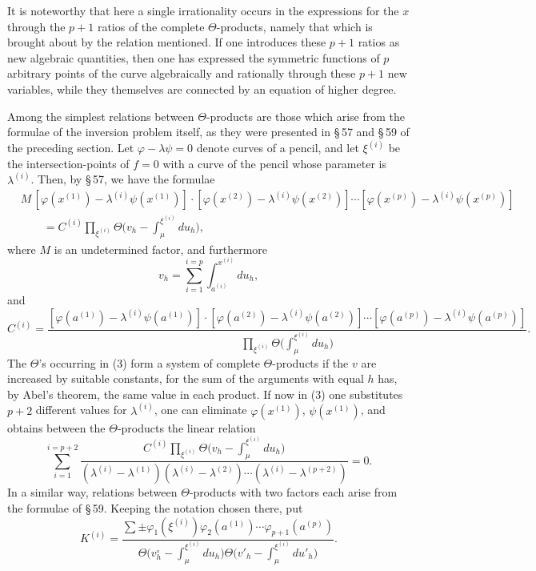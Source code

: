 \documentclass[10pt]{article}
\begin{document}
It is noteworthy that here a single irrationality occurs in the expressions for the \(x\) through the \(p+1\) ratios of the complete \(\Theta\)-products, namely that which is brought about by the relation mentioned. If one introduces these \(p+1\) ratios as new algebraic quantities, then one has expressed the symmetric functions of \(p\) arbitrary points of the curve algebraically and rationally through these \(p+1\) new variables, while they themselves are connected by an equation of higher degree.

Among the simplest relations between \(\Theta\)-products are those which arise from the formulae of the inversion problem itself, as they were presented in \S\,57 and \S\,59 of the preceding section. Let \(\varphi-\lambda\psi=0\) denote curves of a pencil, and let \(\xi^{(i)}\) be the intersection-points of \(f=0\) with a curve of the pencil whose parameter is \(\lambda^{(i)}\). Then, by \S\,57, we have the formulae
\[
\tag{3}
\begin{aligned}
&M\,[\varphi(x^{(1)})-\lambda^{(i)}\psi(x^{(1)})]\cdot[\varphi(x^{(2)})-\lambda^{(i)}\psi(x^{(2)})]\cdots[\varphi(x^{(p)})-\lambda^{(i)}\psi(x^{(p)})]\\
&\qquad = C^{(i)}\prod_{\xi^{(i)}}\Theta\!\biggl(v_h-\int_{\mu}^{\xi^{(i)}}du_h\biggr),
\end{aligned}
\]
where \(M\) is an undetermined factor, and furthermore
\[
v_h=\sum_{i=1}^{i=p}\int_{a^{(i)}}^{x^{(i)}}du_h,
\]
and
\[
C^{(i)}=\frac{[\varphi(a^{(1)})-\lambda^{(i)}\psi(a^{(1)})]\cdot[\varphi(a^{(2)})-\lambda^{(i)}\psi(a^{(2)})]\cdots[\varphi(a^{(p)})-\lambda^{(i)}\psi(a^{(p)})]}{\displaystyle\prod_{\xi^{(i)}}\Theta\!\biggl(\int_{\mu}^{\xi^{(i)}}du_h\biggr)}.
\]
The \(\Theta\)'s occurring in (3) form a system of complete \(\Theta\)-products if the \(v\) are increased by suitable constants, for the sum of the arguments with equal \(h\) has, by Abel's theorem, the same value in each product. If now in (3) one substitutes \(p+2\) different values for \(\lambda^{(i)}\), one can eliminate \(\varphi(x^{(1)})\), \(\psi(x^{(1)})\), and obtains between the \(\Theta\)-products the linear relation
\[
\sum_{i=1}^{i=p+2}
\frac{C^{(i)}\prod_{\xi^{(i)}}\Theta\!\bigl(v_h-\int_{\mu}^{\xi^{(i)}}du_h\bigr)}
{(\lambda^{(i)}-\lambda^{(1)})(\lambda^{(i)}-\lambda^{(2)})\cdots(\lambda^{(i)}-\lambda^{(p+2)})}=0.
\]
In a similar way, relations between \(\Theta\)-products with two factors each arise from the formulae of \S\,59. Keeping the notation chosen there, put
\[
K^{(i)}=\frac{\sum \pm \varphi_1(\xi^{(i)})\varphi_2(a^{(1)})\cdots\varphi_{p+1}(a^{(p)})}
{\Theta\!\bigl(v_h^\circ-\int_{\mu}^{\xi^{(i)}}du_h\bigr)\Theta\!\bigl(v'_h-\int_{\mu}^{\xi^{(i)}}du'_h\bigr)}.
\]
\end{document}
